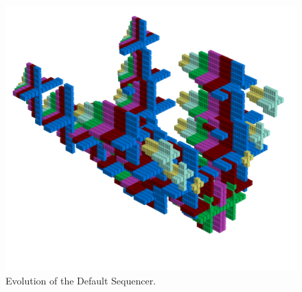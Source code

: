 \clearpage                                                                 
\begin{figure}[H]                                                          
    \centering                                                             
    \hspace*{1cm}
    \begin{adjustbox}{width=17cm,center}                                   
      \includegraphics[width=14cm]{src/sequencer/pattern0-45.png}%
    \end{adjustbox}                                                        
\caption{Evolution of the Default Sequencer.}                                           
\end{figure}                                                               
\clearpage                                                                 
                                                                           
